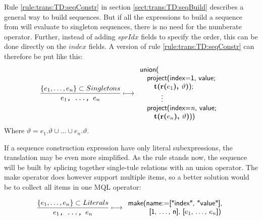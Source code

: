 Rule \ref{rule:trans:TD:seqConstr} in section \ref{sect:trans:TD:seqBuild} describes a general way to build
sequences. But if all the expressions to build a sequence from will evaluate to singleton sequences, there is no
need for the \textsf{numberate} operator. Further, instead of adding $sprIdx$ fields to specify the order, this
can be done directly on the $index$ fields. A version of rule \ref{rule:trans:TD:seqConstr} can therefore be put
like this:
\begin{equation}
\frac{\left\{e_{1},\ldots,e_{n}\right\}\subset{Singletons}}{e_{1}\mbox{\texttt{, \ldots, }}e_{n}}\longmapsto
\begin{array}{l}
\mbox{\textsf{union(}} \\ \quad 
\mbox{\textsf{project(index=1, value; }} \\ \quad \quad 
\mbox{\textbf{t(r(}}e_{1}\mbox{\textbf{), }}\vartheta\mbox{\textbf{)}\textsf{);}} \\ \quad 
\qquad\vdots\\ \quad 
\mbox{\textsf{project(index=}\textit{n}\textsf{, value; }} \\ \quad \quad 
\mbox{\textbf{t(r(}}e_{n}\mbox{\textbf{), }}\vartheta\mbox{\textbf{)}\textsf{))}}
\end{array}
\label{rule:trans:TD:seqIfSingl}
\end{equation}
Where $\vartheta=e_{1}.\vartheta \cup \ldots \cup e_{n}.\vartheta$.

If a sequence construction expression have only literal subexpressions, the translation may be even more
simplified. As the rule stands now, the sequence will be built by splicing together single-tule relations with an
\textsf{union} operator. The \textsf{make} operator does however support multiple items, so a better solution
would be to collect all items in one MQL operator:

\begin{equation}
\frac{\left\{e_{1},\ldots,e_{n}\right\}\subset{Literals}}{e_{1}\mbox{\texttt{, \ldots, }}e_{n}}\longmapsto
\begin{array}{l}
\mbox{\textsf{make(name:=["index", "value"],}} \\ \quad\quad\quad
\mbox{\textsf{[1, \ldots, n], [}}e_{1}\mbox{\textsf{, \ldots, }}e_{n}\mbox{\textsf{])}}
\end{array}
\label{rule:trans:TD:seqIfLit}
\end{equation}


